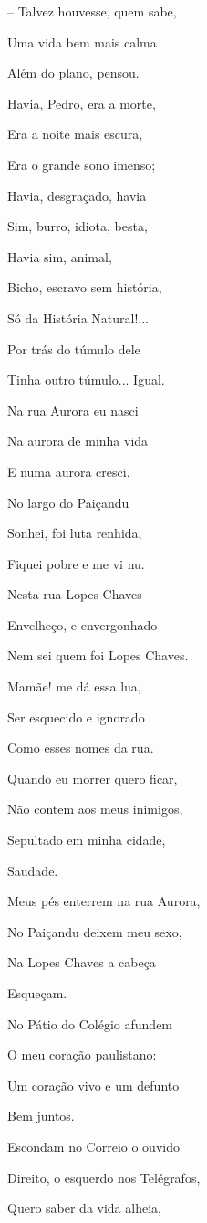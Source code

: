-- Talvez houvesse, quem sabe,

Uma vida bem mais calma

Além do plano, pensou.

Havia, Pedro, era a morte,

Era a noite mais escura,

Era o grande sono imenso;

Havia, desgraçado, havia

Sim, burro, idiota, besta,

Havia sim, animal,

Bicho, escravo sem história,

Só da História Natural!...

Por trás do túmulo dele

Tinha outro túmulo... Igual.

Na rua Aurora eu nasci

Na aurora de minha vida

E numa aurora cresci.

No largo do Paiçandu

Sonhei, foi luta renhida,

Fiquei pobre e me vi nu.

Nesta rua Lopes Chaves

Envelheço, e envergonhado

Nem sei quem foi Lopes Chaves.

Mamãe! me dá essa lua,

Ser esquecido e ignorado

Como esses nomes da rua.

Quando eu morrer quero ficar,

Não contem aos meus inimigos,

Sepultado em minha cidade,

Saudade.

Meus pés enterrem na rua Aurora,

No Paiçandu deixem meu sexo,

Na Lopes Chaves a cabeça

Esqueçam.

No Pátio do Colégio afundem

O meu coração paulistano:

Um coração vivo e um defunto

Bem juntos.

Escondam no Correio o ouvido

Direito, o esquerdo nos Telégrafos,

Quero saber da vida alheia,

